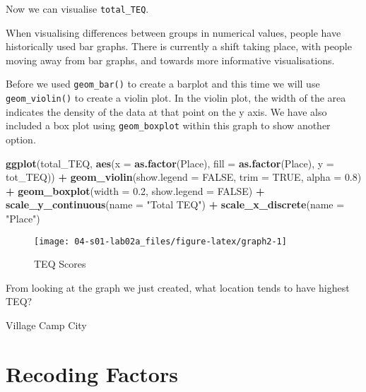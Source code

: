 \documentclass[]{book}
\newenvironment{Shaded}{\begin{snugshade}}{\end{snugshade}}
\newcommand{\DataTypeTok}[1]{\textcolor[rgb]{0.13,0.29,0.53}{#1}}
\newcommand{\FloatTok}[1]{\textcolor[rgb]{0.00,0.00,0.81}{#1}}
\newcommand{\KeywordTok}[1]{\textcolor[rgb]{0.13,0.29,0.53}{\textbf{#1}}}
\newcommand{\NormalTok}[1]{#1}
\newcommand{\OperatorTok}[1]{\textcolor[rgb]{0.81,0.36,0.00}{\textbf{#1}}}
\newcommand{\OtherTok}[1]{\textcolor[rgb]{0.56,0.35,0.01}{#1}}
\newcommand{\StringTok}[1]{\textcolor[rgb]{0.31,0.60,0.02}{#1}}
\begin{document}
Now we can visualise \texttt{total\_TEQ}.

When visualising differences between groups in numerical values, people have historically used bar graphs. There is currently a shift taking place, with people moving away from bar graphs, and towards more informative visualisations.

Before we used \texttt{geom\_bar()} to create a barplot and this time we will use \texttt{geom\_violin()} to create a violin plot. In the violin plot, the width of the area indicates the density of the data at that point on the y axis. We have also included a box plot using \texttt{geom\_boxplot} within this graph to show another option.

\begin{Shaded}
\begin{Highlighting}[]
\KeywordTok{ggplot}\NormalTok{(total_TEQ, }\KeywordTok{aes}\NormalTok{(}\DataTypeTok{x =} \KeywordTok{as.factor}\NormalTok{(Place), }\DataTypeTok{fill =} \KeywordTok{as.factor}\NormalTok{(Place), }\DataTypeTok{y =}\NormalTok{ tot_TEQ)) }\OperatorTok{+}\StringTok{ }\KeywordTok{geom_violin}\NormalTok{(}\DataTypeTok{show.legend =} \OtherTok{FALSE}\NormalTok{, }\DataTypeTok{trim =} \OtherTok{TRUE}\NormalTok{, }\DataTypeTok{alpha =} \FloatTok{0.8}\NormalTok{) }\OperatorTok{+}
\StringTok{  }\KeywordTok{geom_boxplot}\NormalTok{(}\DataTypeTok{width =} \FloatTok{0.2}\NormalTok{, }\DataTypeTok{show.legend =} \OtherTok{FALSE}\NormalTok{) }\OperatorTok{+}
\StringTok{  }\KeywordTok{scale_y_continuous}\NormalTok{(}\DataTypeTok{name =} \StringTok{"Total TEQ"}\NormalTok{) }\OperatorTok{+}
\StringTok{  }\KeywordTok{scale_x_discrete}\NormalTok{(}\DataTypeTok{name =} \StringTok{"Place"}\NormalTok{)}
\end{Highlighting}
\end{Shaded}

\begin{figure}

{\centering \texttt{[image: 04-s01-lab02a\_files/figure-latex/graph2-1]} 

}

\caption{TEQ Scores}\label{fig:graph2}
\end{figure}

From looking at the graph we just created, what location tends to have highest TEQ?

 Village Camp City

\hypertarget{recoding-factors}{%
\section{Recoding Factors}\label{recoding-factors}}
\end{document}
